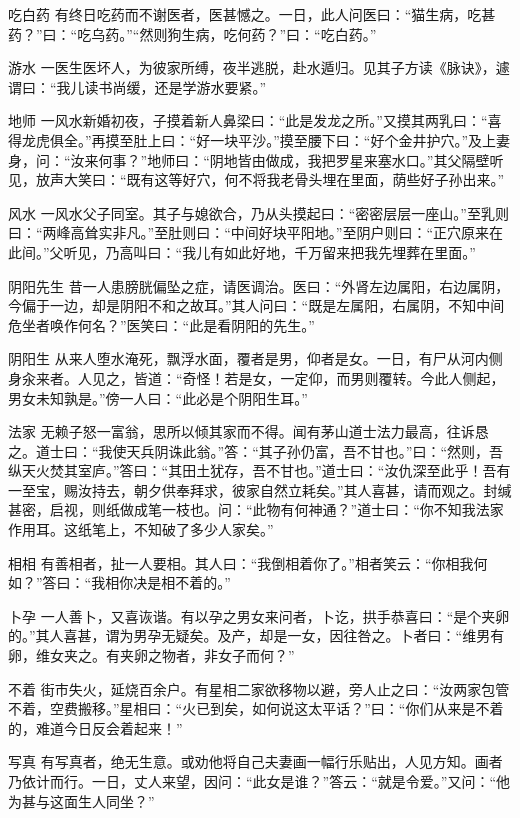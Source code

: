 \documentclass[12pt,UTF8]{ctexbook}
\begin{document}
吃白药
有终日吃药而不谢医者，医甚憾之。一日，此人问医曰：“猫生病，吃甚药？”曰：“吃乌药。”“然则狗生病，吃何药？”曰：“吃白药。”

游水
一医生医坏人，为彼家所缚，夜半逃脱，赴水遁归。见其子方读《脉诀》，遽谓曰：“我儿读书尚缓，还是学游水要紧。”

地师
一风水新婚初夜，子摸着新人鼻梁曰：“此是发龙之所。”又摸其两乳曰：“喜得龙虎俱全。”再摸至肚上曰：“好一块平沙。”摸至腰下曰：“好个金井护穴。”及上妻身，问：“汝来何事？”地师曰：“阴地皆由做成，我把罗星来塞水口。”其父隔壁听见，放声大笑曰：“既有这等好穴，何不将我老骨头埋在里面，荫些好子孙出来。”

风水
一风水父子同室。其子与媳欲合，乃从头摸起曰：“密密层层一座山。”至乳则曰：“两峰高耸实非凡。”至肚则曰：“中间好块平阳地。”至阴户则曰：“正穴原来在此间。”父听见，乃高叫曰：“我儿有如此好地，千万留来把我先埋葬在里面。”

阴阳先生
昔一人患膀胱偏坠之症，请医调治。医曰：“外肾左边属阳，右边属阴，今偏于一边，却是阴阳不和之故耳。”其人问曰：“既是左属阳，右属阴，不知中间危坐者唤作何名？”医笑曰：“此是看阴阳的先生。”

阴阳生
从来人堕水淹死，飘浮水面，覆者是男，仰者是女。一日，有尸从河内侧身汆来者。人见之，皆道：“奇怪！若是女，一定仰，而男则覆转。今此人侧起，男女未知孰是。”傍一人曰：“此必是个阴阳生耳。”

法家
无赖子怒一富翁，思所以倾其家而不得。闻有茅山道士法力最高，往诉恳之。道士曰：“我使天兵阴诛此翁。”答：“其子孙仍富，吾不甘也。”曰：“然则，吾纵天火焚其室庐。”答曰：“其田土犹存，吾不甘也。”道士曰：“汝仇深至此乎！吾有一至宝，赐汝持去，朝夕供奉拜求，彼家自然立耗矣。”其人喜甚，请而观之。封缄甚密，启视，则纸做成笔一枝也。问：“此物有何神通？”道士曰：“你不知我法家作用耳。这纸笔上，不知破了多少人家矣。”

相相
有善相者，扯一人要相。其人曰：“我倒相着你了。”相者笑云：“你相我何如？”答曰：“我相你决是相不着的。”

卜孕
一人善卜，又喜诙谐。有以孕之男女来问者，卜讫，拱手恭喜曰：“是个夹卵的。”其人喜甚，谓为男孕无疑矣。及产，却是一女，因往咎之。卜者曰：“维男有卵，维女夹之。有夹卵之物者，非女子而何？”

不着
街市失火，延烧百余户。有星相二家欲移物以避，旁人止之曰：“汝两家包管不着，空费搬移。”星相曰：“火已到矣，如何说这太平话？”曰：“你们从来是不着的，难道今日反会着起来！”

写真
有写真者，绝无生意。或劝他将自己夫妻画一幅行乐贴出，人见方知。画者乃依计而行。一日，丈人来望，因问：“此女是谁？”答云：“就是令爱。”又问：“他为甚与这面生人同坐？”
\end{document}

